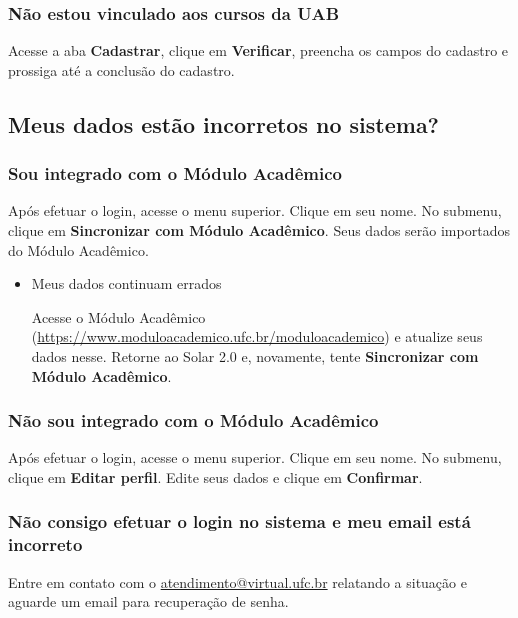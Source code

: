 \documentclass[letterpaper,10pt,english]{sphinxmanual}
\begin{document}
\subsubsection{Não estou vinculado aos cursos da UAB}
\label{faq:id3}
Acesse a aba \textbf{Cadastrar}, clique em \textbf{Verificar}, preencha os campos do cadastro e prossiga até a conclusão do cadastro.


\subsection{Meus dados estão incorretos no sistema?}
\label{faq:meus-dados-estao-incorretos-no-sistema}

\subsubsection{Sou integrado com o Módulo Acadêmico}
\label{faq:sou-integrado-com-o-modulo-academico}
Após efetuar o login, acesse o menu superior. Clique em seu nome. No submenu, clique em \textbf{Sincronizar com Módulo Acadêmico}. Seus dados serão importados do Módulo Acadêmico.
\begin{itemize}
\item {} 
Meus dados continuam errados

Acesse o Módulo Acadêmico (\href{https://www.moduloacademico.ufc.br/moduloacademico}{https://www.moduloacademico.ufc.br/moduloacademico}) e atualize seus dados nesse. Retorne ao Solar 2.0 e, novamente, tente \textbf{Sincronizar com Módulo Acadêmico}.

\end{itemize}


\subsubsection{Não sou integrado com o Módulo Acadêmico}
\label{faq:nao-sou-integrado-com-o-modulo-academico}
Após efetuar o login, acesse o menu superior. Clique em seu nome. No submenu, clique em \textbf{Editar perfil}. Edite seus dados e clique em \textbf{Confirmar}.


\subsubsection{Não consigo efetuar o login no sistema e meu email está incorreto}
\label{faq:nao-consigo-efetuar-o-login-no-sistema-e-meu-email-esta-incorreto}
Entre em contato com o \href{mailto:atendimento@virtual.ufc.br}{atendimento@virtual.ufc.br} relatando a situação e aguarde um email para recuperação de senha.
\end{document}
